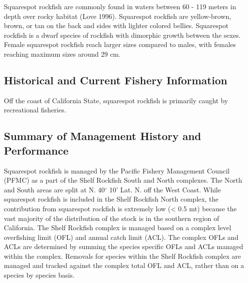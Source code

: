 \documentclass[11pt,
  english,
  a4paper,
]{article}
\begin{document}
\leavevmode\tagmcend\tagstructend


Squarespot rockfish are commonly found in waters between 60 - 119 meters in depth over rocky habitat {(Love 1996)\leavevmode\tagmcend\tagstructend}. Squarespot rockfish are yellow-brown, brown, or tan on the back and sides with lighter colored bellies. Squarespot rockfish is a dwarf species of rockfish with dimorphic growth between the sexes. Female squarespot rockfish reach larger sizes compared to males, with females reaching maximum sizes around 29 cm.

\leavevmode\tagmcend\tagstructend\par


\hypertarget{historical-and-current-fishery-information}{%
\subsection{Historical and Current Fishery Information}\label{historical-and-current-fishery-information}}

\leavevmode\tagmcend\tagstructend


Off the coast of California State, squarespot rockfish is primarily caught by recreational fisheries.

\leavevmode\tagmcend\tagstructend\par


\hypertarget{summary-of-management-history-and-performance}{%
\subsection{Summary of Management History and Performance}\label{summary-of-management-history-and-performance}}

\leavevmode\tagmcend\tagstructend


Squarespot rockfish is managed by the Pacific Fishery Management Council (PFMC) as a part of the Shelf Rockfish South and North complexes. The North and South areas are split at N. 40{\(^\circ\)\leavevmode\tagmcend\tagstructend} 10' Lat. N. off the West Coast. While squarespot rockfish is included in the Shelf Rockfish North complex, the contribution from squarespot rockfish is extremely low (\textless{} 0.5 mt) because the vast majority of the distribution of the stock is in the southern region of California. The Shelf Rockfish complex is managed based on a complex level overfishing limit (OFL) and annual catch limit (ACL). The complex OFLs and ACLs are determined by summing the species specific OFLs and ACLs managed within the complex. Removals for species within the Shelf Rockfish complex are managed and tracked against the complex total OFL and ACL, rather than on a species by species basis.
\end{document}

